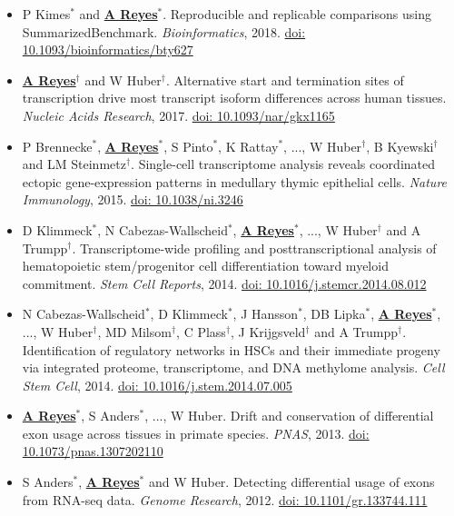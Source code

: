 \documentclass[11pt,a4paper,sans]{moderncv} %
\begin{document}
\begin{itemize}
\item P Kimes$^{\ast}$ and \textbf{\underline{A Reyes}}$^{\ast}$. Reproducible and replicable comparisons using SummarizedBenchmark. \textit{Bioinformatics}, 2018. \href{https://doi.org/10.1093/bioinformatics/bty627}{doi: 10.1093/bioinformatics/bty627}
\item \textbf{\underline{A Reyes}}$^{\dagger}$ and W Huber$^{\dagger}$. Alternative start and termination sites of transcription drive most transcript isoform differences across human tissues. \textit{Nucleic Acids Research}, 2017. \href{https://doi.org/10.1093/nar/gkx1165}{doi: 10.1093/nar/gkx1165}
\item P Brennecke$^{\ast}$, \textbf{\underline{A Reyes}}$^{\ast}$, S Pinto$^{\ast}$, K Rattay$^{\ast}$, ..., W Huber$^{\dagger}$, B Kyewski$^{\dagger}$ and LM Steinmetz$^{\dagger}$. Single-cell transcriptome analysis reveals coordinated ectopic gene-expression patterns in medullary thymic epithelial cells. \textit{Nature Immunology}, 2015. \href{https://doi.org/10.1038/ni.3246}{doi: 10.1038/ni.3246}
\item D Klimmeck$^{\ast}$, N Cabezas-Wallscheid$^{\ast}$, \textbf{\underline{A Reyes}}$^{\ast}$, ..., W Huber$^{\dagger}$ and A Trumpp$^{\dagger}$. Transcriptome-wide profiling and posttranscriptional analysis of hematopoietic stem/progenitor cell differentiation toward myeloid commitment. \textit{Stem Cell Reports}, 2014. \href{https://doi.org/10.1016/j.stemcr.2014.08.012}{doi: 10.1016/j.stemcr.2014.08.012}
\item N Cabezas-Wallscheid$^{\ast}$, D Klimmeck$^{\ast}$, J Hansson$^{\ast}$, DB Lipka$^{\ast}$, \textbf{\underline{A Reyes}}$^{\ast}$, ..., W Huber$^{\dagger}$, MD Milsom$^{\dagger}$, C Plass$^{\dagger}$, J Krijgsveld$^{\dagger}$ and A Trumpp$^{\dagger}$. Identification of regulatory networks in HSCs and their immediate progeny via integrated proteome, transcriptome, and DNA methylome analysis. \textit{Cell Stem Cell}, 2014. \href{https://doi.org/10.1016/j.stem.2014.07.005}{doi: 10.1016/j.stem.2014.07.005}
\item \textbf{\underline{A Reyes}}$^{\ast}$, S Anders$^{\ast}$, ..., W Huber. Drift and conservation of differential exon usage across tissues in primate species. \textit{PNAS}, 2013. \href{https://doi.org/10.1073/pnas.1307202110}{doi: 10.1073/pnas.1307202110}
\item S Anders$^{\ast}$, \textbf{\underline{A Reyes}}$^{\ast}$ and W Huber. Detecting differential usage of exons from RNA-seq data. \textit{Genome Research}, 2012. \href{https://doi.org/10.1101/gr.133744.111}{doi: 10.1101/gr.133744.111}
\end{itemize}
\end{document}
